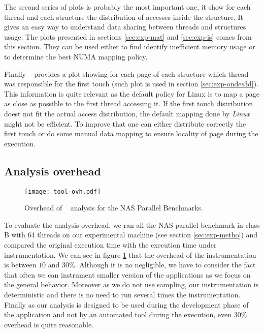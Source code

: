 The second series of plots is probably the most important one, it show for
each thread and each structure the distribution of accesses inside the
structure. It gives an easy way to understand data sharing between threads and
structures usage. The plots presented in sections \ref{sec:exp-mat} and
\ref{sec:exp-is} comes from this section. They can be used either to
find identify inefficient memory usage or to determine the best NUMA mapping
policy.

Finally \TABARNAC~ provides a plot showing for each page of each structure
which thread was responsible for the first touch (such plot is used in section
\ref{sec:exp-ondes3d}). This information is quite relevant as the default
policy for Linux is to map a page as close as possible to the first thread
accessing it. If the first touch distribution doest not fit the actual access
distribution, the default mapping done by \emph{Linux} might not be efficient.
To improve that one can either distribute correctly the first touch or do some
manual data mapping to ensure locality of page during the execution.

\subsection{Analysis overhead}
\label{sec:expe-overhead}

\begin{figure}[htb]
    \centering
    \texttt{[image: tool-ovh.pdf]}
    \caption{Overhead of \TABARNAC~ analysis for the NAS Parallel Benchmarks.}
    \label{fig:ovh}
\end{figure}

To evaluate the analysis overhead, we ran all the NAS parallel benchmark in
class B with 64 threads on our experimental machine (see section
\ref{sec:exp-metho}) and compared the original execution time with the
execution time under instrumentation. We can see in figure \ref{fig:ovh} that
the overhead of the instrumentation is between $10$ and $30\%$. Although it is
no negligible, we have to consider the fact that often we can instrument
smaller version of the applications as we focus on the general behavior.
Moreover as we do not use sampling, our instrumentation is deterministic and
there is no need to run several times the instrumentation. Finally as our
analysis is designed to be used during the development phase of the
application and not by an automated tool during the execution, even $30\%$
overhead is quite reasonable.
